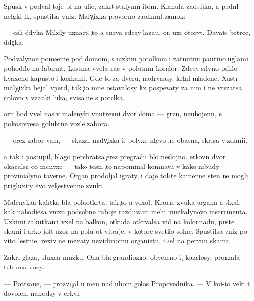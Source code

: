 \documentclass[10pt]{book}
\begin{document}
Spusk v podval toje b{\yi}l na uli{\q}e, zakr{\yi}t{\yi}{\y} stalyn{\yi}m {\x}itom. Kla{\q}nula zadvijka, {\y}a podn{\ia}l nel{\e}gki{\y} l{\iu}k, spustilsa vniz. Maly{\c}ixka provorno za{\x}olknul zamok:

— {\Y}esli d{\ia}dyka Mikely uzna{\y}et, {\c}to {\y}a snova zdesy laza{\y}u, on uxi otorv{\e}t. Dava{\y}te b{\yi}stre{\y}e, d{\ia}de{\c}ka.

Podvalyno{\y}e pome{\x}eni{\y}e pod domom, s nizkim potolkom i zat{\ia}nut{\yi}mi pautino{\y} uglami pohodilo na labirint. Lestni{\q}a v{\yi}vela nas v polut{\e}mn{\yi}{\y} koridor. Zdesy silyno pahlo kvaxeno{\y} kapusto{\y} i koxkami. Gde-to za dver{\y}u, nadr{\yi}va{\y}asy, kri{\c}al mladene{\q}. Xustr{\yi}{\y} maly{\c}ixka bejal vper{\e}d, tak {\c}to mne ostavalosy lix pospevaty za nim i ne vrezatsa golovo{\y} v v{\ia}zanki luka, svisa{\y}u{\x}i{\y}e s potolka.

{\C}orn{\yi}{\y} hod v{\yi}vel nas v malenyki{\y} vnutrenni{\y} dvor doma — gr{\ia}zn{\yi}{\y}, neuhojenn{\yi}{\y}, s pokosivxe{\y}sa golub{\ia}tne{\y} vozle zabora.

— {\C}erez zabor vam, — skazal maly{\c}ixka i, bolyxe ni{\c}evo ne ob{\y}asn{\ia}{\y}a, skr{\yi}lsa v zdani{\y}i.

{\Y}a tak i postupil, blago perebratsa {\c}erez pregradu b{\yi}lo neslojno. {\Q}erkovn{\yi}{\y} dvor okazalsa {\y}e{\x}o menyxe — tako{\y} tesn{\yi}{\y}, {\c}to napominal komnatu v kako{\y}-nibudy provin{\q}ialyno{\y} taverne. Organ prodoljal igraty, i daje tolst{\yi}{\y}e kamenn{\yi}{\y}e sten{\yi} ne mogli prigluxity {\y}evo veli{\c}estvenn{\yi}{\y}e zvuki.

Malenyka{\y}a kalitka b{\yi}la poluotkr{\yi}ta, tak {\c}to {\y}a voxol. Krome zvuka organa {\y}a sl{\yi}xal, kak nahod{\ia}{\x}i{\y}esa vnizu podsobn{\yi}{\y}e rabo{\c}i{\y}e razduva{\y}ut mehi muz{\yi}kalynovo instrumenta. Uzkimi zakutkami v{\yi}xel na balkon, otkuda otkr{\yi}valsa vid na kolonnadu, pust{\yi}{\y}e skam{\yf}i i {\y}arko-jolt{\yi}{\y} uzor na polu ot vitraje{\y}, v kotor{\yi}{\y}e svetilo soln{\q}e. Spustilsa vniz po vito{\y} lestni{\q}e, rexiv ne mexaty nevidimomu organistu, i sel na pervu{\y}u skam{\y}u.

Zakr{\yi}l glaza, sluxa{\y}a muz{\yi}ku. Ona b{\yi}la grandiozno{\y}, obyemno{\y} i, kazalosy, pronzala teb{\ia} naskvozy.

— Potr{\ia}sa{\y}u{\x}e, — prozvu{\c}al u men{\ia} nad uhom golos Propovednika. — V ko{\y}i-to veki t{\yi} dovolen, nahod{\ia}sy v {\q}erkvi.
\end{document}
